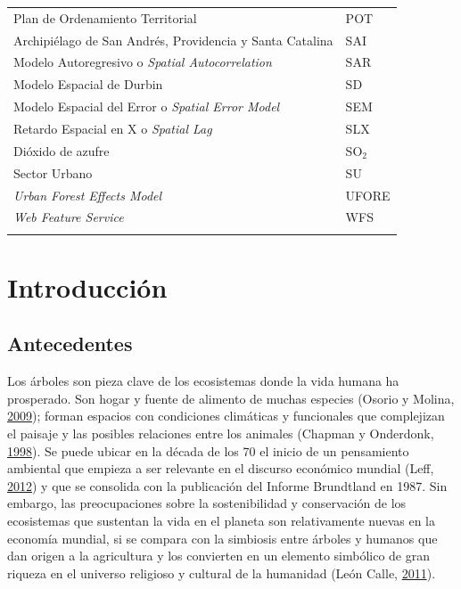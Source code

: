 \documentclass[12pt,a4paper,oneside, openany]{book}
\theoremstyle{definition}
\theoremstyle{definition}
\theoremstyle{definition}
\theoremstyle{remark}
\begin{document}
\begin{longtable}{>{\raggedright\arraybackslash}p{10cm}l}
\rowcolor{gray!6}  Plan de Ordenamiento Territorial & POT\\
Archipiélago de San Andrés, Providencia y Santa Catalina & SAI\\
\rowcolor{gray!6}  Modelo Autoregresivo o \textit{Spatial Autocorrelation} & SAR\\
\addlinespace
Modelo Espacial de Durbin & SD\\
\rowcolor{gray!6}  Modelo Espacial del Error o \textit{Spatial Error Model} & SEM\\
Retardo Espacial en X o \textit{Spatial Lag} & SLX\\
\rowcolor{gray!6}  Dióxido de azufre & SO$_2$\\
Sector Urbano & SU\\
\addlinespace
\rowcolor{gray!6}  \textit{Urban Forest Effects Model} & UFORE\\
\textit{Web Feature Service} & WFS\\*
\end{longtable}

\listoffigures

\listoftables

\chapter{Introducción}\label{intro}

\section{Antecedentes}\label{antecedentes}

Los árboles son pieza clave de los ecosistemas donde la vida humana ha
prosperado. Son hogar y fuente de alimento de muchas especies (Osorio y
Molina, \protect\hyperlink{ref-osorio_vuelo_2009}{2009}); forman
espacios con condiciones climáticas y funcionales que complejizan el
paisaje y las posibles relaciones entre los animales (Chapman y
Onderdonk, \protect\hyperlink{ref-chapman_forests_1998}{1998}). Se puede
ubicar en la década de los 70 el inicio de un pensamiento ambiental que
empieza a ser relevante en el discurso económico mundial (Leff,
\protect\hyperlink{ref-leff_pensamiento_2012}{2012}) y que se consolida
con la publicación del Informe Brundtland en 1987. Sin embargo, las
preocupaciones sobre la sostenibilidad y conservación de los ecosistemas
que sustentan la vida en el planeta son relativamente nuevas en la
economía mundial, si se compara con la simbiosis entre árboles y humanos
que dan origen a la agricultura y los convierten en un elemento
simbólico de gran riqueza en el universo religioso y cultural de la
humanidad (León Calle,
\protect\hyperlink{ref-leon_calle_arboles_2011}{2011}).
\end{document}

